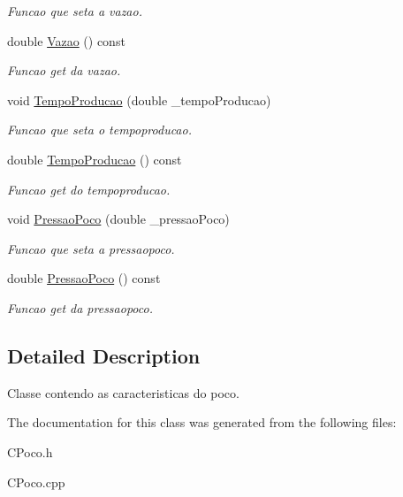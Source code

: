\begin{DoxyCompactItemize}
\begin{DoxyCompactList}\small\item\em Funcao que seta a vazao. \end{DoxyCompactList}\item 
\hypertarget{classCPoco_a2988747a01ebf170e1ca56d407e2c5c6}{double \hyperlink{classCPoco_a2988747a01ebf170e1ca56d407e2c5c6}{Vazao} () const }\label{classCPoco_a2988747a01ebf170e1ca56d407e2c5c6}

\begin{DoxyCompactList}\small\item\em Funcao get da vazao. \end{DoxyCompactList}\item 
\hypertarget{classCPoco_a0458cc7f91feb48f0d925f3075eaad5f}{void \hyperlink{classCPoco_a0458cc7f91feb48f0d925f3075eaad5f}{Tempo\-Producao} (double \-\_\-tempo\-Producao)}\label{classCPoco_a0458cc7f91feb48f0d925f3075eaad5f}

\begin{DoxyCompactList}\small\item\em Funcao que seta o tempoproducao. \end{DoxyCompactList}\item 
\hypertarget{classCPoco_aa416c03fa3d259322d5a015dff4b1d98}{double \hyperlink{classCPoco_aa416c03fa3d259322d5a015dff4b1d98}{Tempo\-Producao} () const }\label{classCPoco_aa416c03fa3d259322d5a015dff4b1d98}

\begin{DoxyCompactList}\small\item\em Funcao get do tempoproducao. \end{DoxyCompactList}\item 
\hypertarget{classCPoco_a5c0737c83668c9d6e0e40685bed11472}{void \hyperlink{classCPoco_a5c0737c83668c9d6e0e40685bed11472}{Pressao\-Poco} (double \-\_\-pressao\-Poco)}\label{classCPoco_a5c0737c83668c9d6e0e40685bed11472}

\begin{DoxyCompactList}\small\item\em Funcao que seta a pressaopoco. \end{DoxyCompactList}\item 
\hypertarget{classCPoco_a570c72af4e2f331bfb3236dcc09161bf}{double \hyperlink{classCPoco_a570c72af4e2f331bfb3236dcc09161bf}{Pressao\-Poco} () const }\label{classCPoco_a570c72af4e2f331bfb3236dcc09161bf}

\begin{DoxyCompactList}\small\item\em Funcao get da pressaopoco. \end{DoxyCompactList}\end{DoxyCompactItemize}


\subsection{Detailed Description}
Classe contendo as caracteristicas do poco. 

The documentation for this class was generated from the following files\-:\begin{DoxyCompactItemize}
\item 
C\-Poco.\-h\item 
C\-Poco.\-cpp\end{DoxyCompactItemize}
